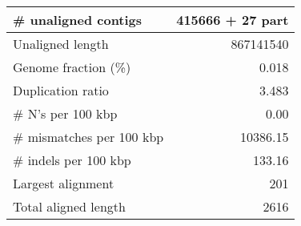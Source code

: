 \documentclass[12pt,a4paper]{article}
\begin{document}
\begin{table}[ht]
\begin{center}
\begin{tabular}{|l*{1}{|r}|}
\# unaligned contigs & 415666 + 27 part \\ \hline
Unaligned length & 867141540 \\ \hline
Genome fraction (\%) & 0.018 \\ \hline
Duplication ratio & 3.483 \\ \hline
\# N's per 100 kbp & 0.00 \\ \hline
\# mismatches per 100 kbp & 10386.15 \\ \hline
\# indels per 100 kbp & 133.16 \\ \hline
Largest alignment & 201 \\ \hline
Total aligned length & 2616 \\ \hline
\end{tabular}
\end{center}
\end{table}
\end{document}
